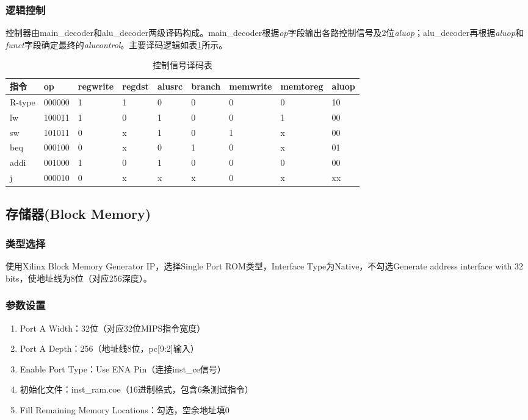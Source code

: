 \subsubsection{逻辑控制}
控制器由main\_decoder和alu\_decoder两级译码构成。main\_decoder根据\textit{op}字段输出各路控制信号及2位\textit{aluop}；alu\_decoder再根据\textit{aluop}和\textit{funct}字段确定最终的\textit{alucontrol}。主要译码逻辑如表\ref{tab:decode}所示。

\begin{table}[htp]
\caption{控制信号译码表}\label{tab:decode}
\begin{center}
    \begin{tabular}{|l|l|l|l|l|l|l|l|l|}
    \hline
    \textbf{指令} & \textbf{op} & \textbf{regwrite} & \textbf{regdst} & \textbf{alusrc} & \textbf{branch} & \textbf{memwrite} & \textbf{memtoreg} & \textbf{aluop} \\ \hline \hline
    R-type & 000000 & 1 & 1 & 0 & 0 & 0 & 0 & 10 \\ \hline
    lw     & 100011 & 1 & 0 & 1 & 0 & 0 & 1 & 00 \\ \hline
    sw     & 101011 & 0 & x & 1 & 0 & 1 & x & 00 \\ \hline
    beq    & 000100 & 0 & x & 0 & 1 & 0 & x & 01 \\ \hline
    addi   & 001000 & 1 & 0 & 1 & 0 & 0 & 0 & 00 \\ \hline
    j      & 000010 & 0 & x & x & x & 0 & x & xx \\ \hline
    \end{tabular}
\end{center}
\end{table}

\subsection{存储器(Block Memory)}\label{sub:ctl}

\subsubsection{类型选择}
使用Xilinx Block Memory Generator IP，选择Single Port ROM类型，Interface Type为Native，不勾选Generate address interface with 32 bits，使地址线为8位（对应256深度）。

\subsubsection{参数设置}
\begin{enumerate}
    \item Port A Width：32位（对应32位MIPS指令宽度）
    \item Port A Depth：256（地址线8位，pc[9:2]输入）
    \item Enable Port Type：Use ENA Pin（连接inst\_ce信号）
    \item 初始化文件：inst\_ram.coe（16进制格式，包含6条测试指令）
    \item Fill Remaining Memory Locations：勾选，空余地址填0
\end{enumerate}

